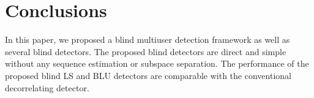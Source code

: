 \documentclass[a4paper,10pt,fleqn, twocolumn]{IEEETran}
\begin{document}
\section{Conclusions}
In this paper, we proposed a blind multiuser detection framework
as well as several blind detectors. The proposed blind detectors
are direct and simple without any sequence estimation or subspace
separation. The performance of the proposed blind LS and BLU
detectors are comparable with the conventional decorrelating
detector.

\small


\end{document}
